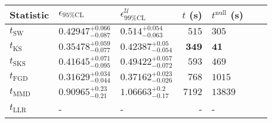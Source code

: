 \begin{tabular}{l|llr|llr}
	Statistic & $\epsilon_{95\%\mathrm{CL}}$ & $\epsilon^    {\mathcal{U}}_{99\%\mathrm{CL}}$ & $t$ (s) & $t^{\mathrm{null}}$ (s) \\
	\midrule
	$t_{\mathrm{SW}}$ & $0.42947_{-0.087}^{+0.066}$ & $0.514_{-0.063}^{+0.054}$ & $515$ & $305$ \\
	$t_{\overline{\mathrm{KS}}}$ & $0.35478_{-0.077}^{+0.059}$ & $0.42387_{-0.054}^{+0.05}$ & ${\mathbf{349}}$ & ${\mathbf{41}}$ \\
	$t_{\mathrm{SKS}}$ & $0.41645_{-0.095}^{+0.071}$ & $0.49422_{-0.072}^{+0.057}$ & $593$ & $469$ \\
	$t_{\mathrm{FGD}}$ & ${\mathbf{0.31629_{-0.044}^{+0.034}}}$ & ${\mathbf{0.37162_{-0.026}^{+0.023}}}$ & $768$ & $1015$ \\
	$t_{\mathrm{MMD}}$ & $0.90965_{-0.21}^{+0.23}$ & $1.06663_{-0.17}^{+0.2}$ & $7192$ & $13839$ \\
	$t_{\mathrm{LLR}}$ & - & - & - & - \\
	\bottomrule
\end{tabular}